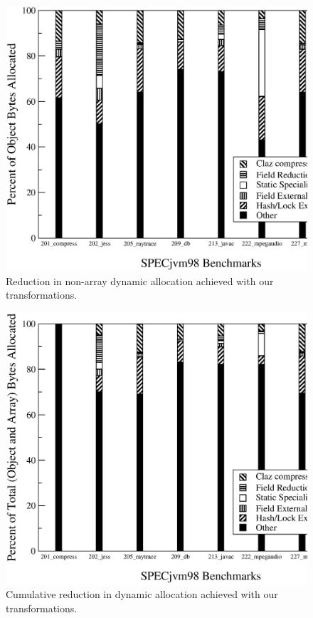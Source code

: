 \documentclass{acmconf}
\begin{document}
\begin{figure}
\includegraphics[scale=0.32,clip=true]{Figures/oopsla-objalloc.eps}
\caption{Reduction in non-array dynamic allocation achieved with
  our transformations.}
\label{fig:total}
\end{figure}
\begin{figure}
\includegraphics[scale=0.32,clip=true]{Figures/oopsla-ttlalloc.eps}
\caption{Cumulative reduction in dynamic allocation achieved with
  our transformations.}
\label{fig:total}
\end{figure}
\end{document}
